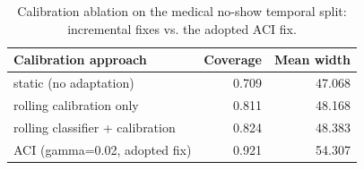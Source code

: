 \begin{table}[htbp]
\centering
\caption{Calibration ablation on the medical no-show temporal split: incremental fixes vs. the adopted ACI fix.}
\label{tab:ablation}
\begin{tabular}{lrr}
\toprule
Calibration approach & Coverage & Mean width \\
\midrule
static (no adaptation) & 0.709 & 47.068 \\
rolling calibration only & 0.811 & 48.168 \\
rolling classifier + calibration & 0.824 & 48.383 \\
ACI (gamma=0.02, adopted fix) & 0.921 & 54.307 \\
\bottomrule
\end{tabular}
\end{table}
